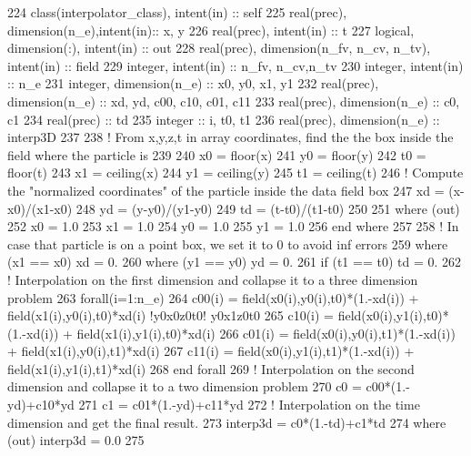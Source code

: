 \begin{DoxyCode}
224     \textcolor{keywordtype}{class}(interpolator\_class), \textcolor{keywordtype}{intent(in)} :: self
225     \textcolor{keywordtype}{real(prec)}, \textcolor{keywordtype}{dimension(n\_e)},\textcolor{keywordtype}{intent(in)}:: x, y
226     \textcolor{keywordtype}{real(prec)}, \textcolor{keywordtype}{intent(in)} :: t
227     \textcolor{keywordtype}{logical}, \textcolor{keywordtype}{dimension(:)}, \textcolor{keywordtype}{intent(in)} :: out
228     \textcolor{keywordtype}{real(prec)}, \textcolor{keywordtype}{dimension(n\_fv, n\_cv, n\_tv)}, \textcolor{keywordtype}{intent(in)} :: field
229     \textcolor{keywordtype}{integer}, \textcolor{keywordtype}{intent(in)} :: n\_fv, n\_cv,n\_tv
230     \textcolor{keywordtype}{integer}, \textcolor{keywordtype}{intent(in)} :: n\_e
231     \textcolor{keywordtype}{integer}, \textcolor{keywordtype}{dimension(n\_e)} :: x0, y0, x1, y1
232     \textcolor{keywordtype}{real(prec)}, \textcolor{keywordtype}{dimension(n\_e)} :: xd, yd, c00, c10, c01, c11
233     \textcolor{keywordtype}{real(prec)}, \textcolor{keywordtype}{dimension(n\_e)} :: c0, c1
234     \textcolor{keywordtype}{real(prec)} :: td
235     \textcolor{keywordtype}{integer} :: i, t0, t1
236     \textcolor{keywordtype}{real(prec)}, \textcolor{keywordtype}{dimension(n\_e)} :: interp3D
237 
238     \textcolor{comment}{! From x,y,z,t in array coordinates, find the the box inside the field where the particle is}
239 
240     x0 = floor(x)
241     y0 = floor(y)
242     t0 = floor(t)
243     x1 = ceiling(x)
244     y1 = ceiling(y)
245     t1 = ceiling(t)
246     \textcolor{comment}{! Compute the "normalized coordinates" of the particle inside the data field box}
247     xd = (x-x0)/(x1-x0)
248     yd = (y-y0)/(y1-y0)
249     td = (t-t0)/(t1-t0)
250 
251     \textcolor{keywordflow}{where} (out)
252         x0 = 1.0
253         x1 = 1.0
254         y0 = 1.0
255         y1 = 1.0
256 \textcolor{keywordflow}{    end where}
257 
258     \textcolor{comment}{! In case that particle is on a point box, we set it to 0 to avoid inf errors}
259     \textcolor{keywordflow}{where} (x1 == x0) xd = 0.
260     \textcolor{keywordflow}{where} (y1 == y0) yd = 0.
261     \textcolor{keywordflow}{if} (t1 == t0)    td = 0.
262     \textcolor{comment}{! Interpolation on the first dimension and collapse it to a three dimension problem}
263     \textcolor{keywordflow}{forall}(i=1:n\_e)
264         c00(i) = field(x0(i),y0(i),t0)*(1.-xd(i)) + field(x1(i),y0(i),t0)*xd(i) \textcolor{comment}{!y0x0z0t0!  y0x1z0t0}
265         c10(i) = field(x0(i),y1(i),t0)*(1.-xd(i)) + field(x1(i),y1(i),t0)*xd(i)
266         c01(i) = field(x0(i),y0(i),t1)*(1.-xd(i)) + field(x1(i),y0(i),t1)*xd(i)
267         c11(i) = field(x0(i),y1(i),t1)*(1.-xd(i)) + field(x1(i),y1(i),t1)*xd(i)
268 \textcolor{keywordflow}{    end forall}
269     \textcolor{comment}{! Interpolation on the second dimension and collapse it to a two dimension problem}
270     c0 = c00*(1.-yd)+c10*yd
271     c1 = c01*(1.-yd)+c11*yd
272     \textcolor{comment}{! Interpolation on the time dimension and get the final result.}
273     interp3d = c0*(1.-td)+c1*td
274     \textcolor{keywordflow}{where} (out) interp3d = 0.0
275 
\end{DoxyCode}
